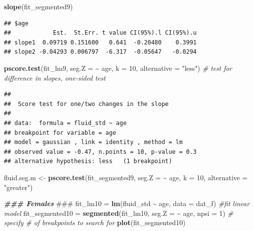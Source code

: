 \documentclass[
]{article}
\newenvironment{Shaded}{\begin{snugshade}}{\end{snugshade}}
\newcommand{\AlertTok}[1]{\textcolor[rgb]{0.94,0.16,0.16}{#1}}
\newcommand{\AttributeTok}[1]{\textcolor[rgb]{0.13,0.29,0.53}{#1}}
\newcommand{\CommentTok}[1]{\textcolor[rgb]{0.56,0.35,0.01}{\textit{#1}}}
\newcommand{\DecValTok}[1]{\textcolor[rgb]{0.00,0.00,0.81}{#1}}
\newcommand{\DocumentationTok}[1]{\textcolor[rgb]{0.56,0.35,0.01}{\textbf{\textit{#1}}}}
\newcommand{\FunctionTok}[1]{\textcolor[rgb]{0.13,0.29,0.53}{\textbf{#1}}}
\newcommand{\NormalTok}[1]{#1}
\newcommand{\OtherTok}[1]{\textcolor[rgb]{0.56,0.35,0.01}{#1}}
\newcommand{\SpecialCharTok}[1]{\textcolor[rgb]{0.81,0.36,0.00}{\textbf{#1}}}
\newcommand{\StringTok}[1]{\textcolor[rgb]{0.31,0.60,0.02}{#1}}
\begin{document}
\begin{Shaded}
\begin{Highlighting}[]
\FunctionTok{slope}\NormalTok{(fit\_segmented9)}
\end{Highlighting}
\end{Shaded}

\begin{verbatim}
## $age
##            Est.  St.Err. t value CI(95%).l CI(95%).u
## slope1  0.09719 0.151600   0.641  -0.20480    0.3991
## slope2 -0.04293 0.006797  -6.317  -0.05647   -0.0294
\end{verbatim}

\begin{Shaded}
\begin{Highlighting}[]
\FunctionTok{pscore.test}\NormalTok{(fit\_lm9, }\AttributeTok{seg.Z =} \SpecialCharTok{\textasciitilde{}}\NormalTok{ age, }\AttributeTok{k =} \DecValTok{10}\NormalTok{, }\AttributeTok{alternative =} \StringTok{"less"}\NormalTok{) }\CommentTok{\# test for difference in slopes, one{-}sided test}
\end{Highlighting}
\end{Shaded}

\begin{verbatim}
## 
##  Score test for one/two changes in the slope
## 
## data:  formula = fluid_std ~ age 
## breakpoint for variable = age 
## model = gaussian , link = identity , method = lm
## observed value = -0.47, n.points = 10, p-value = 0.3
## alternative hypothesis: less   (1 breakpoint)
\end{verbatim}

\begin{Shaded}
\begin{Highlighting}[]
\NormalTok{fluid.seg.m }\OtherTok{\textless{}{-}} \FunctionTok{pscore.test}\NormalTok{(fit\_segmented9, }\AttributeTok{seg.Z =} \SpecialCharTok{\textasciitilde{}}\NormalTok{ age, }\AttributeTok{k =} \DecValTok{10}\NormalTok{, }\AttributeTok{alternative =} \StringTok{"greater"}\NormalTok{)}

\DocumentationTok{\#\#\# Females }\AlertTok{\#\#\#}
\NormalTok{fit\_lm10 }\OtherTok{=} \FunctionTok{lm}\NormalTok{(fluid\_std }\SpecialCharTok{\textasciitilde{}}\NormalTok{ age, }\AttributeTok{data =}\NormalTok{ dat\_f) }\CommentTok{\#fit linear model}
\NormalTok{fit\_segmented10 }\OtherTok{=} \FunctionTok{segmented}\NormalTok{(fit\_lm10, }\AttributeTok{seg.Z =} \SpecialCharTok{\textasciitilde{}}\NormalTok{ age, }\AttributeTok{npsi =} \DecValTok{1}\NormalTok{)   }\CommentTok{\# specify \# of breakpoints to search for}
\FunctionTok{plot}\NormalTok{(fit\_segmented10)}
\end{Highlighting}
\end{Shaded}
\end{document}
